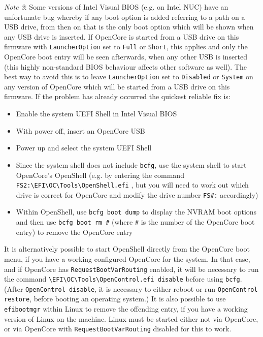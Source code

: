 \documentclass[]{article}
\providecommand{\tightlist}{%
  \setlength{\itemsep}{0pt}\setlength{\parskip}{0pt}}
\begin{document}
\begin{enumerate}
  \emph{Note 3}: Some versions of Intel Visual BIOS (e.g. on Intel NUC) have an unfortunate bug whereby if any boot
  option is added referring to a path on a USB drive, from then on that is the only boot option which will be shown
  when any USB drive is inserted. If OpenCore is started from a USB drive on this firmware with
  \texttt{LauncherOption} set to \texttt{Full} or \texttt{Short}, this applies and only the OpenCore boot entry will be
  seen afterwards, when any other USB is inserted (this highly non-standard BIOS behaviour affects other software as well).
  The best way to avoid this is to leave \texttt{LauncherOption} set to \texttt{Disabled} or \texttt{System} on any
  version of OpenCore which will be started from a USB drive on this firmware. If the problem has already
  occurred the quickest reliable fix is:
  \begin{itemize}
  \tightlist
    \item Enable the system UEFI Shell in Intel Visual BIOS
    \item With power off, insert an OpenCore USB
    \item Power up and select the system UEFI Shell
    \item Since the system shell does not include \texttt{bcfg}, use the system shell to start OpenCore's OpenShell
    (e.g. by entering the command \texttt{FS2:\textbackslash EFI\textbackslash OC\textbackslash Tools\textbackslash OpenShell.efi} ,
    but you will need to work out which drive is correct for OpenCore and modify the drive number \texttt{FS\#:} accordingly)
    \item Within OpenShell, use \texttt{bcfg boot dump} to display the NVRAM boot options and then use \texttt{bcfg boot rm \#}
    (where \texttt{\#} is the number of the OpenCore boot entry) to remove the OpenCore entry
  \end{itemize}
  It is alternatively possible to start OpenShell directly from the OpenCore boot menu, if you have
  a working configured OpenCore for the system. In that case, and if OpenCore has \texttt{RequestBootVarRouting} enabled, it will be
  necessary to run the command \texttt{\textbackslash EFI\textbackslash OC\textbackslash Tools\textbackslash OpenControl.efi disable}
  before using \texttt{bcfg}. (After \texttt{OpenControl disable}, it is necessary to either reboot or run \texttt{OpenControl restore},
  before booting an operating system.)
  It is also possible to use \texttt{efibootmgr} within Linux to remove the offending entry, if you have a working
  version of Linux on the machine. Linux must be started either not via OpenCore, or via OpenCore with \texttt{RequestBootVarRouting} disabled
  for this to work.


\end{enumerate}
\end{document}
